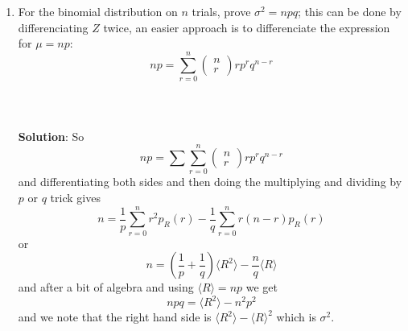 \documentclass[11pt,a4paper]{scrartcl}
\begin{document}
\begin{enumerate}
\item For the binomial distribution on $n$ trials, prove
  $\sigma^2=npq$; this can be done by differenciating $Z$ twice, an
  easier approach is to differenciate the expression for $\mu=np$:
  \begin{equation}
    np=\sum_{r=0}^n \left(\begin{array}{c}n\\r\end{array}\right)rp^rq^{n-r}
  \end{equation}
\\ \\ \\ 
\textbf{Solution}: So
\begin{equation}
    np=\sum \sum_{r=0}^n \left(\begin{array}{c}n\\r\end{array}\right)rp^rq^{n-r}
\end{equation}
and differentiating both sides and then doing the multiplying and dividing by $p$ or $q$ trick gives
\begin{equation}
n=\frac{1}{p}\sum_{r=0}^n r^2p_R(r)-\frac{1}{q}\sum_{r=0}^n r(n-r)p_R(r)
\end{equation}
or
\begin{equation}
n=\left(\frac{1}{p}+\frac{1}{q}\right)\langle R^2\rangle-\frac{n}{q}\langle R\rangle
\end{equation}
and after a bit of algebra and using $\langle R\rangle =np$ we get
\begin{equation}
  npq=\langle R^2\rangle -n^2p^2
\end{equation}
and we note that the right hand side is $\langle R^2\rangle-\langle R\rangle^2$ which is $\sigma^2$.


\end{enumerate}
\end{document}

